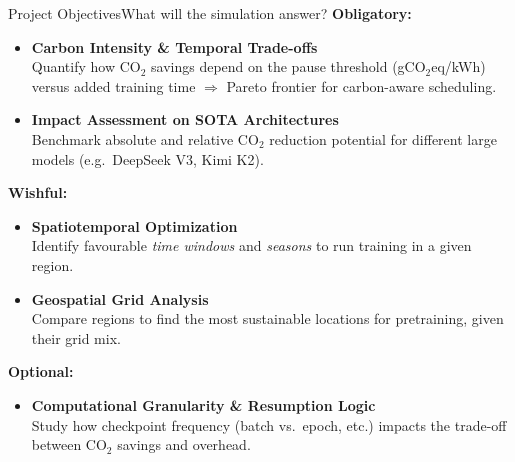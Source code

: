 \begin{frame}[t]{Project Objectives}{What will the simulation answer?}
  \textbf{Obligatory:}
  \begin{itemize}
    \item \textbf{Carbon Intensity \& Temporal Trade-offs}\\
      Quantify how CO$_2$ savings depend on the pause threshold
      (gCO$_2$eq/kWh) versus added training time
      $\Rightarrow$ Pareto frontier for carbon-aware scheduling.
    \item \textbf{Impact Assessment on SOTA Architectures}\\
      Benchmark absolute and relative CO$_2$ reduction potential for
      different large models (e.g.\ DeepSeek V3, Kimi K2).
  \end{itemize}

  \vspace{0.3cm}
  \textbf{Wishful:}
  \begin{itemize}
    \item \textbf{Spatiotemporal Optimization}\\
      Identify favourable \emph{time windows} and \emph{seasons}
      to run training in a given region.
    \item \textbf{Geospatial Grid Analysis}\\
      Compare regions to find the most sustainable locations
      for pretraining, given their grid mix.
  \end{itemize}

  \vspace{0.3cm}
  \textbf{Optional:}
  \begin{itemize}
    \item \textbf{Computational Granularity \& Resumption Logic}\\
      Study how checkpoint frequency (batch vs.\ epoch, etc.)
      impacts the trade-off between CO$_2$ savings and overhead.
  \end{itemize}

\end{frame}
